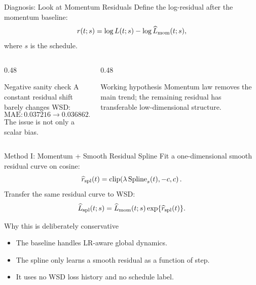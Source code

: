 \documentclass[fontset=fandol,aspectratio=169,10pt]{ctexbeamer}
\newcommand{\mae}{\mathrm{MAE}}
\begin{document}
\begin{frame}{Diagnosis: Look at Momentum Residuals}
  Define the log-residual after the momentum baseline:
  \[
    r(t; s)=\log L(t;s)-\log \widehat L_{\rm mom}(t;s),
  \]
  where \(s\) is the schedule.

  \vspace{0.4em}
  \begin{columns}[T,onlytextwidth]
    \begin{column}{0.48\textwidth}
      \begin{block}{Negative sanity check}
        A constant residual shift barely changes WSD:
        \[
          \mae: 0.037216\rightarrow 0.036862.
        \]
        The issue is not only a scalar bias.
      \end{block}
    \end{column}
    \begin{column}{0.48\textwidth}
      \begin{block}{Working hypothesis}
        Momentum law removes the main trend; the remaining residual has transferable low-dimensional structure.
      \end{block}
    \end{column}
  \end{columns}
\end{frame}

\begin{frame}{Method I: Momentum + Smooth Residual Spline}
  Fit a one-dimensional smooth residual curve on cosine:
  \[
    \widehat r_{\rm spl}(t)
    =
    \mathrm{clip}\!\left(\lambda\,\mathrm{Spline}_s(t),-c,c\right).
  \]
  Transfer the same residual curve to WSD:
  \[
    \widehat L_{\rm spl}(t;s)
    =
    \widehat L_{\rm mom}(t;s)\exp\{\widehat r_{\rm spl}(t)\}.
  \]

  \begin{block}{Why this is deliberately conservative}
    \begin{itemize}
      \item The baseline handles LR-aware global dynamics.
      \item The spline only learns a smooth residual as a function of step.
      \item It uses no WSD loss history and no schedule label.
    \end{itemize}
  \end{block}
\end{frame}
\end{document}
